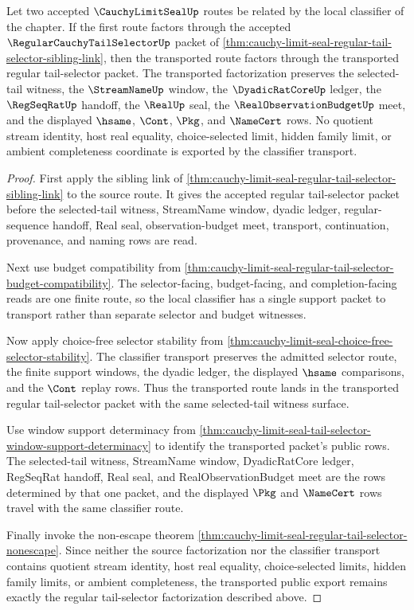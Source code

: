 \begin{theorem}
\label{thm:cauchy-limit-seal-regular-tail-selector-classifier-stability}
Let two accepted $\CauchyLimitSealUp$ routes be related by the local classifier of the chapter. If the first route factors through the accepted $\RegularCauchyTailSelectorUp$ packet of \autoref{thm:cauchy-limit-seal-regular-tail-selector-sibling-link}, then the transported route factors through the transported regular tail-selector packet. The transported factorization preserves the selected-tail witness, the $\StreamNameUp$ window, the $\DyadicRatCoreUp$ ledger, the $\RegSeqRatUp$ handoff, the $\RealUp$ seal, the $\RealObservationBudgetUp$ meet, and the displayed $\hsame$, $\Cont$, $\Pkg$, and $\NameCert$ rows. No quotient stream identity, host real equality, choice-selected limit, hidden family limit, or ambient completeness coordinate is exported by the classifier transport.
\end{theorem}
\begin{proof}
First apply the sibling link of \autoref{thm:cauchy-limit-seal-regular-tail-selector-sibling-link} to the source route. It gives the accepted regular tail-selector packet before the selected-tail witness, StreamName window, dyadic ledger, regular-sequence handoff, Real seal, observation-budget meet, transport, continuation, provenance, and naming rows are read.

Next use budget compatibility from \autoref{thm:cauchy-limit-seal-regular-tail-selector-budget-compatibility}. The selector-facing, budget-facing, and completion-facing reads are one finite route, so the local classifier has a single support packet to transport rather than separate selector and budget witnesses.

Now apply choice-free selector stability from \autoref{thm:cauchy-limit-seal-choice-free-selector-stability}. The classifier transport preserves the admitted selector route, the finite support windows, the dyadic ledger, the displayed $\hsame$ comparisons, and the $\Cont$ replay rows. Thus the transported route lands in the transported regular tail-selector packet with the same selected-tail witness surface.

Use window support determinacy from \autoref{thm:cauchy-limit-seal-tail-selector-window-support-determinacy} to identify the transported packet's public rows. The selected-tail witness, StreamName window, DyadicRatCore ledger, RegSeqRat handoff, Real seal, and RealObservationBudget meet are the rows determined by that one packet, and the displayed $\Pkg$ and $\NameCert$ rows travel with the same classifier route.

Finally invoke the non-escape theorem \autoref{thm:cauchy-limit-seal-regular-tail-selector-nonescape}. Since neither the source factorization nor the classifier transport contains quotient stream identity, host real equality, choice-selected limits, hidden family limits, or ambient completeness, the transported public export remains exactly the regular tail-selector factorization described above.
\end{proof}

